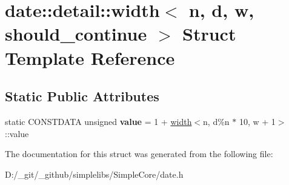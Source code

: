 \hypertarget{structdate_1_1detail_1_1width}{}\section{date\+::detail\+::width$<$ n, d, w, should\+\_\+continue $>$ Struct Template Reference}
\label{structdate_1_1detail_1_1width}
\subsection*{Static Public Attributes}
\begin{DoxyCompactItemize}
\item 
\mbox{\label{structdate_1_1detail_1_1width_ac76362103ef10fda4549a4781cdf70bf}} 
static C\+O\+N\+S\+T\+D\+A\+TA unsigned {\bfseries value} = 1 + \mbox{\hyperlink{structdate_1_1detail_1_1width}{width}}$<$n, d\%n $\ast$ 10, w + 1$>$\+::value
\end{DoxyCompactItemize}


The documentation for this struct was generated from the following file\+:\begin{DoxyCompactItemize}
\item 
D\+:/\+\_\+git/\+\_\+github/simplelibs/\+Simple\+Core/date.\+h\end{DoxyCompactItemize}
